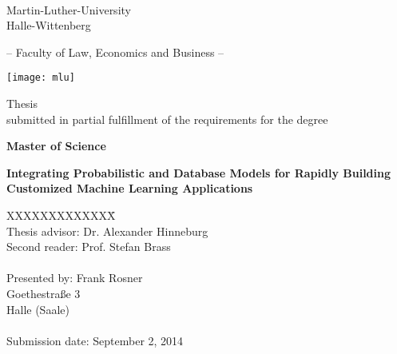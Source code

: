 \label{Titelseite}

\begin{titlepage}
\begin{center}

\ 

\vspace{2\baselineskip}

Martin-Luther-University\\
Halle-Wittenberg

\vspace{\baselineskip}

-- Faculty of Law, Economics and Business --

\vspace{\baselineskip}

\texttt{[image: mlu]}

\vspace{2\baselineskip}

Thesis\\
submitted in partial fulfillment of the requirements for the degree

\textbf{Master of Science}

\vspace{2\baselineskip}

\renewcommand{\baselinestretch}{1.4}\normalsize
\textbf{\Large{Integrating Probabilistic and Database Models for Rapidly Building Customized Machine Learning Applications}}

\renewcommand{\baselinestretch}{1.00}\normalsize
\vspace{\baselineskip}

\vspace*{2\baselineskip}

\parbox{0cm}{
\begin{tabbing}
XXXXXXXXXXXXX\= \kill \\ 
Thesis advisor:\> Dr. Alexander Hinneburg\\
Second reader:\> Prof. Stefan Brass\\
\\
Presented by:
\> Frank Rosner\\
\> Goethestraße 3\\
 Halle (Saale)\\
\\
Submission date: \>September 2, 2014
\end{tabbing}}

\end{center}
\end{titlepage}
